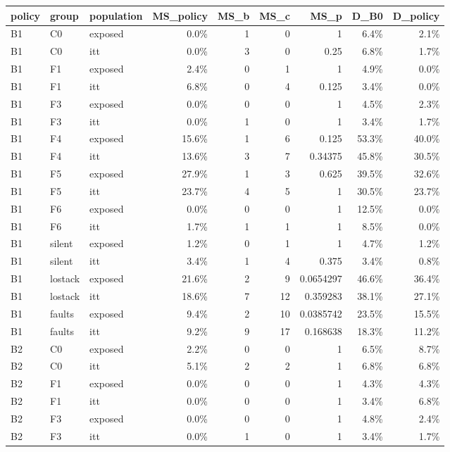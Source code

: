 \begin{tabular}{lllrrrrrr}
\toprule
policy & group & population & MS\_policy & MS\_b & MS\_c & MS\_p & D\_B0 & D\_policy \\
\midrule
B1 & C0 & exposed & 0.0\% & 1 & 0 & 1 & 6.4\% & 2.1\% \\
B1 & C0 & itt & 0.0\% & 3 & 0 & 0.25 & 6.8\% & 1.7\% \\
B1 & F1 & exposed & 2.4\% & 0 & 1 & 1 & 4.9\% & 0.0\% \\
B1 & F1 & itt & 6.8\% & 0 & 4 & 0.125 & 3.4\% & 0.0\% \\
B1 & F3 & exposed & 0.0\% & 0 & 0 & 1 & 4.5\% & 2.3\% \\
B1 & F3 & itt & 0.0\% & 1 & 0 & 1 & 3.4\% & 1.7\% \\
B1 & F4 & exposed & 15.6\% & 1 & 6 & 0.125 & 53.3\% & 40.0\% \\
B1 & F4 & itt & 13.6\% & 3 & 7 & 0.34375 & 45.8\% & 30.5\% \\
B1 & F5 & exposed & 27.9\% & 1 & 3 & 0.625 & 39.5\% & 32.6\% \\
B1 & F5 & itt & 23.7\% & 4 & 5 & 1 & 30.5\% & 23.7\% \\
B1 & F6 & exposed & 0.0\% & 0 & 0 & 1 & 12.5\% & 0.0\% \\
B1 & F6 & itt & 1.7\% & 1 & 1 & 1 & 8.5\% & 0.0\% \\
B1 & silent & exposed & 1.2\% & 0 & 1 & 1 & 4.7\% & 1.2\% \\
B1 & silent & itt & 3.4\% & 1 & 4 & 0.375 & 3.4\% & 0.8\% \\
B1 & lostack & exposed & 21.6\% & 2 & 9 & 0.0654297 & 46.6\% & 36.4\% \\
B1 & lostack & itt & 18.6\% & 7 & 12 & 0.359283 & 38.1\% & 27.1\% \\
B1 & faults & exposed & 9.4\% & 2 & 10 & 0.0385742 & 23.5\% & 15.5\% \\
B1 & faults & itt & 9.2\% & 9 & 17 & 0.168638 & 18.3\% & 11.2\% \\
B2 & C0 & exposed & 2.2\% & 0 & 0 & 1 & 6.5\% & 8.7\% \\
B2 & C0 & itt & 5.1\% & 2 & 2 & 1 & 6.8\% & 6.8\% \\
B2 & F1 & exposed & 0.0\% & 0 & 0 & 1 & 4.3\% & 4.3\% \\
B2 & F1 & itt & 0.0\% & 0 & 0 & 1 & 3.4\% & 6.8\% \\
B2 & F3 & exposed & 0.0\% & 0 & 0 & 1 & 4.8\% & 2.4\% \\
B2 & F3 & itt & 0.0\% & 1 & 0 & 1 & 3.4\% & 1.7\% \\

\end{tabular}
